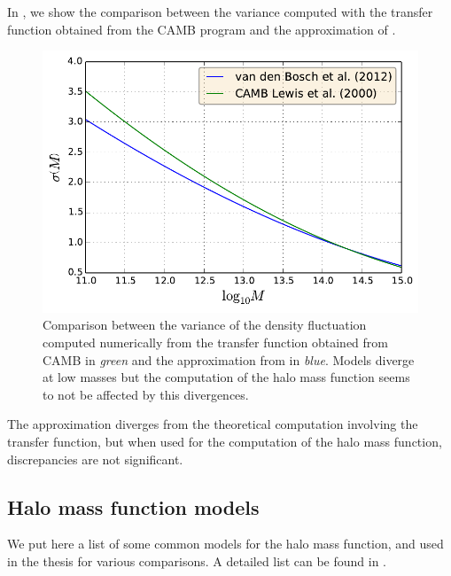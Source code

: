 In , we show the comparison between the variance
computed with the transfer function obtained from the CAMB program and the
approximation of \citet{vandenBosch+02}.
%
\begin{figure}[htb]
    \centering
    \includegraphics[width=0.6\linewidth]{figures/hmf/sigma.pdf}
    \caption{Comparison between the variance of the density fluctuation
        computed numerically from the transfer function obtained from CAMB
        \citep{Lewis+00} in \emph{green} and the approximation from
        \citet{vandenBosch+02} in \emph{blue}. Models diverge at low masses
        but the computation of the halo mass function seems to not be
    affected by this divergences.\label{fig:sigma}}
\end{figure}
%
The approximation diverges from the theoretical computation involving the
transfer function, but when used for the computation of the halo mass
function, discrepancies are not significant.

\subsection{Halo mass function models}
\label{sub:halo_mass_function_models}

We put here a list of some common models for the halo mass function, and
used in the thesis for various comparisons. A detailed list can be found in
\citet{Murray+13}.

